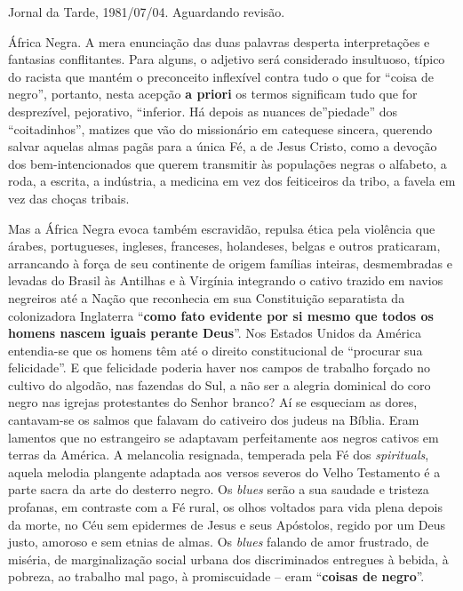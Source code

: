 \documentclass[
  letterpaper,
  DIV=11,
  numbers=noendperiod]{scrreprt}
\begin{document}
Jornal da Tarde, 1981/07/04. Aguardando revisão.

\hfill\break

África Negra. A mera enunciação das duas palavras desperta
interpretações e fantasias conflitantes. Para alguns, o adjetivo será
considerado insultuoso, típico do racista que mantém o preconceito
inflexível contra tudo o que for ``coisa de negro'', portanto, nesta
acepção \textbf{a priori} os termos significam tudo que for desprezível,
pejorativo, ``inferior. Há depois as nuances de''piedade'' dos
``coitadinhos'', matizes que vão do missionário em catequese sincera,
querendo salvar aquelas almas pagãs para a única Fé, a de Jesus Cristo,
como a devoção dos bem-intencionados que querem transmitir às populações
negras o alfabeto, a roda, a escrita, a indústria, a medicina em vez dos
feiticeiros da tribo, a favela em vez das choças tribais.

Mas a África Negra evoca também escravidão, repulsa ética pela violência
que árabes, portugueses, ingleses, franceses, holandeses, belgas e
outros praticaram, arrancando à força de seu continente de origem
famílias inteiras, desmembradas e levadas do Brasil às Antilhas e à
Virgínia integrando o cativo trazido em navios negreiros até a Nação que
reconhecia em sua Constituição separatista da colonizadora Inglaterra
``\textbf{como fato evidente por si mesmo que todos os homens nascem
iguais perante Deus}''. Nos Estados Unidos da América entendia-se que os
homens têm até o direito constitucional de ``procurar sua felicidade''.
E que felicidade poderia haver nos campos de trabalho forçado no cultivo
do algodão, nas fazendas do Sul, a não ser a alegria dominical do coro
negro nas igrejas protestantes do Senhor branco? Aí se esqueciam as
dores, cantavam-se os salmos que falavam do cativeiro dos judeus na
Bíblia. Eram lamentos que no estrangeiro se adaptavam perfeitamente aos
negros cativos em terras da América. A melancolia resignada, temperada
pela Fé dos \emph{spirituals}, aquela melodia plangente adaptada aos
versos severos do Velho Testamento é a parte sacra da arte do desterro
negro. Os \emph{blues} serão a sua saudade e tristeza profanas, em
contraste com a Fé rural, os olhos voltados para vida plena depois da
morte, no Céu sem epidermes de Jesus e seus Apóstolos, regido por um
Deus justo, amoroso e sem etnias de almas. Os \emph{blues} falando de
amor frustrado, de miséria, de marginalização social urbana dos
discriminados entregues à bebida, à pobreza, ao trabalho mal pago, à
promiscuidade -- eram ``\textbf{coisas de negro}''.
\end{document}
